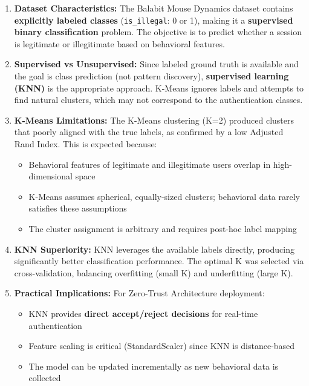 \documentclass[11pt]{article}
\providecommand{\tightlist}{%
      \setlength{\itemsep}{0pt}\setlength{\parskip}{0pt}}
\begin{document}
\begin{enumerate}
\def\labelenumi{\arabic{enumi}.}
\item
  \textbf{Dataset Characteristics:} The Balabit Mouse Dynamics dataset
  contains \textbf{explicitly labeled classes} (\texttt{is\_illegal}: 0
  or 1), making it a \textbf{supervised binary classification} problem.
  The objective is to predict whether a session is legitimate or
  illegitimate based on behavioral features.
\item
  \textbf{Supervised vs Unsupervised:} Since labeled ground truth is
  available and the goal is class prediction (not pattern discovery),
  \textbf{supervised learning (KNN)} is the appropriate approach.
  K-Means ignores labels and attempts to find natural clusters, which
  may not correspond to the authentication classes.
\item
  \textbf{K-Means Limitations:} The K-Means clustering (K=2) produced
  clusters that poorly aligned with the true labels, as confirmed by a
  low Adjusted Rand Index. This is expected because:

  \begin{itemize}
  \tightlist
  \item
    Behavioral features of legitimate and illegitimate users overlap in
    high-dimensional space
  \item
    K-Means assumes spherical, equally-sized clusters; behavioral data
    rarely satisfies these assumptions
  \item
    The cluster assignment is arbitrary and requires post-hoc label
    mapping
  \end{itemize}
\item
  \textbf{KNN Superiority:} KNN leverages the available labels directly,
  producing significantly better classification performance. The optimal
  K was selected via cross-validation, balancing overfitting (small K)
  and underfitting (large K).
\item
  \textbf{Practical Implications:} For Zero-Trust Architecture
  deployment:

  \begin{itemize}
  \tightlist
  \item
    KNN provides \textbf{direct accept/reject decisions} for real-time
    authentication
  \item
    Feature scaling is critical (StandardScaler) since KNN is
    distance-based
  \item
    The model can be updated incrementally as new behavioral data is
    collected
  \end{itemize}
\end{enumerate}
\end{document}
